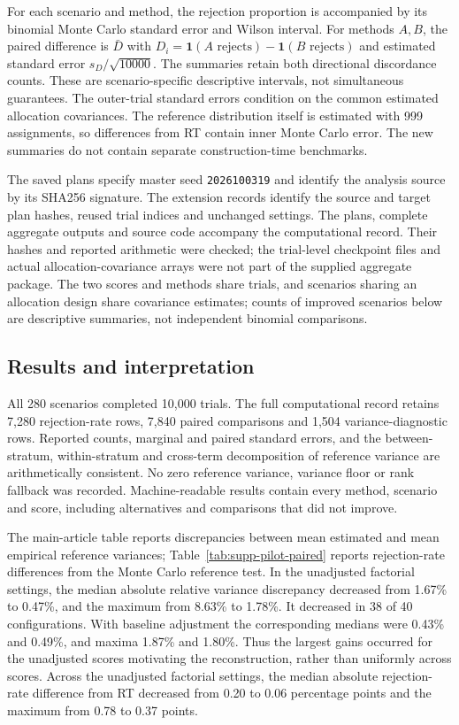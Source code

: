 \documentclass[12pt,a4paper]{article}
\theoremstyle{definition}
\theoremstyle{remark}\newtheorem{remark}{Remark}
\numberwithin{equation}{section}
\begin{document}
For each scenario and method, the rejection proportion is accompanied by its binomial Monte Carlo standard error and Wilson interval. For methods $A,B$, the paired difference is $\bar D$ with $D_i=\mathbf1(A\text{ rejects})-\mathbf1(B\text{ rejects})$ and estimated standard error $s_D/\sqrt{10000}$. The summaries retain both directional discordance counts. These are scenario-specific descriptive intervals, not simultaneous guarantees. The outer-trial standard errors condition on the common estimated allocation covariances. The reference distribution itself is estimated with 999 assignments, so differences from RT contain inner Monte Carlo error. The new summaries do not contain separate construction-time benchmarks.

The saved plans specify master seed \texttt{2026100319} and identify the analysis source by its SHA256 signature. The extension records identify the source and target plan hashes, reused trial indices and unchanged settings. The plans, complete aggregate outputs and source code accompany the computational record. Their hashes and reported arithmetic were checked; the trial-level checkpoint files and actual allocation-covariance arrays were not part of the supplied aggregate package. The two scores and methods share trials, and scenarios sharing an allocation design share covariance estimates; counts of improved scenarios below are descriptive summaries, not independent binomial comparisons.

\subsection{Results and interpretation}
All 280 scenarios completed 10,000 trials. The full computational record retains 7,280 rejection-rate rows, 7,840 paired comparisons and 1,504 variance-diagnostic rows. Reported counts, marginal and paired standard errors, and the between-stratum, within-stratum and cross-term decomposition of reference variance are arithmetically consistent. No zero reference variance, variance floor or rank fallback was recorded. Machine-readable results contain every method, scenario and score, including alternatives and comparisons that did not improve.

The main-article table reports discrepancies between mean estimated and mean empirical reference variances; Table~\ref{tab:supp-pilot-paired} reports rejection-rate differences from the Monte Carlo reference test. In the unadjusted factorial settings, the median absolute relative variance discrepancy decreased from 1.67\% to 0.47\%, and the maximum from 8.63\% to 1.78\%. It decreased in 38 of 40 configurations. With baseline adjustment the corresponding medians were 0.43\% and 0.49\%, and maxima 1.87\% and 1.80\%. Thus the largest gains occurred for the unadjusted scores motivating the reconstruction, rather than uniformly across scores. Across the unadjusted factorial settings, the median absolute rejection-rate difference from RT decreased from 0.20 to 0.06 percentage points and the maximum from 0.78 to 0.37 points.
\end{document}
